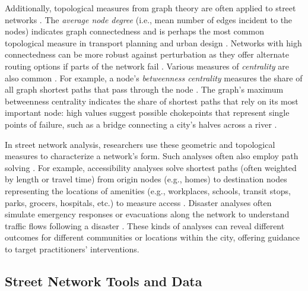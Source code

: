 \documentclass[12pt,letterpaper]{article} %
\begin{document}
Additionally, topological measures from graph theory are often applied to street networks \citep{barthelemy_spatial_2022}. The \textit{average node degree} (i.e., mean number of edges incident to the nodes) indicates graph connectedness and is perhaps the most common topological measure in transport planning and urban design \citep[e.g.,][]{barrington-leigh_century_2015,barrington-leigh_more_2017,barrington-leigh_global_2020}. Networks with high connectedness can be more robust against perturbation as they offer alternate routing options if parts of the network fail \citep{boeing_resilient_2024}. Various measures of \textit{centrality} are also common \citep{crucitti_centrality_2006}. For example, a node's \textit{betweenness centrality} measures the share of all graph shortest paths that pass through the node \citep{barthelemy_betweenness_2004,barthelemy_self-organization_2013}. The graph's maximum betweenness centrality indicates the share of shortest paths that rely on its most important node: high values suggest possible chokepoints that represent single points of failure, such as a bridge connecting a city's halves across a river \citep{boeing_resilient_2024}.

In street network analysis, researchers use these geometric and topological measures to characterize a network's form. Such analyses often also employ path solving \citep{miller_measuring_1999,wang_road_2020}. For example, accessibility analyses solve shortest paths (often weighted by length or travel time) from origin nodes (e.g., homes) to destination nodes representing the locations of amenities (e.g., workplaces, schools, transit stops, parks, grocers, hospitals, etc.) to measure access \citep{foti_behavioral_2014,liu_generalized_2022}. Disaster analyses often simulate emergency responses or evacuations along the network to understand traffic flows following a disaster \citep{sasabe_road_2020,tamakloe_finding_2021}. These kinds of analyses can reveal different outcomes for different communities or locations within the city, offering guidance to target practitioners' interventions.

\subsection{Street Network Tools and Data}
\end{document}
